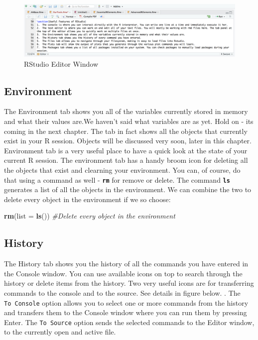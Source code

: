 \documentclass[]{krantz}
\makeatletter
\newenvironment{Shaded}{\begin{snugshade}}{\end{snugshade}}
\newcommand{\KeywordTok}[1]{\textcolor[rgb]{0.27,0.27,0.27}{\textbf{#1}}}
\newcommand{\DataTypeTok}[1]{\textcolor[rgb]{0.27,0.27,0.27}{#1}}
\newcommand{\CommentTok}[1]{\textcolor[rgb]{0.37,0.37,0.37}{\textit{#1}}}
\newcommand{\NormalTok}[1]{#1}
\newenvironment{kframe}{%
\medskip{}
\setlength{\fboxsep}{.8em}
 \def\at@end@of@kframe{}%
 \ifinner\ifhmode%
  \def\at@end@of@kframe{\end{minipage}}%
  \begin{minipage}{\columnwidth}%
 \fi\fi%
 \def\FrameCommand##1{\hskip\@totalleftmargin \hskip-\fboxsep
 \colorbox{shadecolor}{##1}\hskip-\fboxsep
     \hskip-\linewidth \hskip-\@totalleftmargin \hskip\columnwidth}%
 \MakeFramed {\advance\hsize-\width
   \@totalleftmargin\z@ \linewidth\hsize
   \@setminipage}}%
 {\par\unskip\endMakeFramed%
 \at@end@of@kframe}
\renewenvironment{Shaded}{\begin{kframe}}{\end{kframe}}
\makeatother
\begin{document}
\begin{figure}
\centering
\includegraphics{images/editor.png}
\caption{RStudio Editor Window}
\end{figure}

\subsection{Environment}\label{environment}

The Environment tab shows you all of the variables currently stored in
memory and what their values are.We haven't said what variables are as
yet. Hold on - its coming in the next chapter. The tab in fact shows all
the objects that currently exist in your R session. Objects will be
discussed very soon, later in this chapter. Environment tab is a very
useful place to have a quick look at the state of your current R
session. The environment tab has a handy broom icon for deleting all the
objects that exist and clearning your environment. You can, of course,
do that using a command as well - \textbf{\texttt{rm}} for remove or
delete. The command \textbf{\texttt{ls}} generates a list of all the
objects in the environment. We can combine the two to delete every
object in the environment if we so choose:

\begin{Shaded}
\begin{Highlighting}[]
\KeywordTok{rm}\NormalTok{(}\DataTypeTok{list =} \KeywordTok{ls}\NormalTok{()) }\CommentTok{#Delete every object in the environment}
\end{Highlighting}
\end{Shaded}

\subsection{History}\label{history}

The History tab shows you the history of all the commands you have
entered in the Console window. You can use available icons on top to
search through the history or delete items from the history. Two very
useful icons are for transferring commands to the console and to the
source. See details in figure below. . The \texttt{To\ Console} option
allows you to select one or more commands from the history and transfers
them to the Console window where you can run them by pressing Enter. The
\texttt{To\ Source} option sends the selected commands to the Editor
window, to the currently open and active file.
\end{document}
